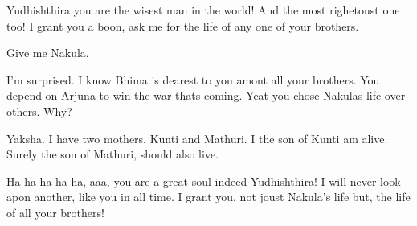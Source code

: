 Yudhishthira you are the wisest man in the world! And the most righetoust one too!
I grant you a boon, ask me for the life of any one of your brothers.

Give me Nakula.

I'm surprised. I know Bhima is dearest to you amont all your brothers. You depend on Arjuna to win the war thats coming. Yeat you chose Nakulas life over others. Why?

Yaksha. I have two mothers. Kunti and Mathuri. I the son of Kunti am alive. Surely the son of Mathuri, should also live.

Ha ha ha ha ha, aaa, you are a great soul indeed Yudhishthira! I will never look apon another, like you in all time.
I grant you, not joust Nakula's life but, the life of all your brothers!

